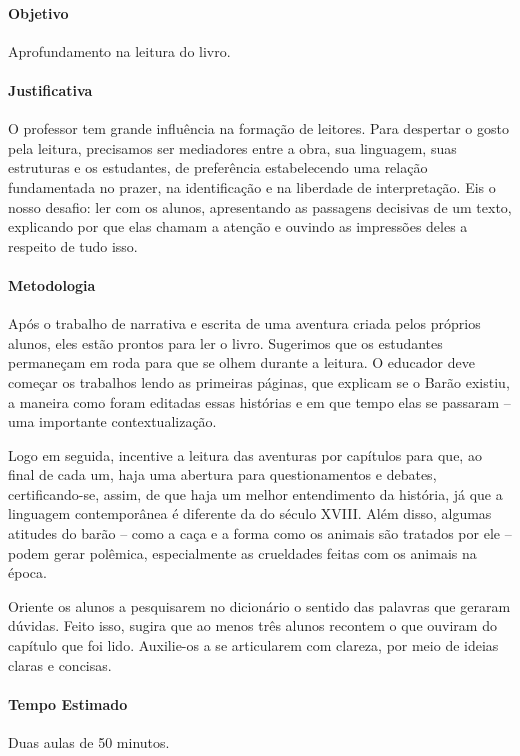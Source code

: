 \documentclass[11pt]{extarticle}
\begin{document}
\paragraph{Objetivo} Aprofundamento na leitura do livro.   

\paragraph{Justificativa} O professor tem grande influência na formação de leitores. Para despertar o gosto pela leitura, precisamos ser mediadores entre a obra, sua linguagem, suas estruturas e os estudantes, de preferência estabelecendo uma relação fundamentada no prazer, na identificação e na liberdade de interpretação. Eis o nosso desafio: ler com os alunos, apresentando as passagens decisivas de um texto, explicando por que elas chamam a atenção e  ouvindo as impressões deles a respeito de tudo isso. 

\paragraph{Metodologia} Após o trabalho de narrativa e escrita de uma aventura criada pelos próprios alunos, eles estão prontos para ler o livro. Sugerimos que os estudantes permaneçam em roda para que se olhem durante a leitura. O educador deve começar os trabalhos lendo as primeiras páginas, que explicam se o Barão existiu, a maneira como foram editadas essas histórias e em que tempo elas se passaram -- uma importante contextualização. 

Logo em seguida, incentive a leitura das aventuras por capítulos para que, ao final de cada um, haja uma abertura para questionamentos e debates, certificando-se, assim, de que haja um melhor entendimento da história, já que a linguagem contemporânea é diferente da do século XVIII. Além disso, algumas atitudes do barão -- como a caça e a forma como os animais são tratados por ele -- podem gerar polêmica, especialmente as crueldades feitas com os animais na época. 

Oriente os alunos a pesquisarem no dicionário o sentido das palavras que geraram dúvidas. Feito isso, sugira que ao menos três alunos recontem o que ouviram do capítulo que foi lido. Auxilie-os a se articularem com clareza, por meio de ideias claras e concisas.

\paragraph{Tempo Estimado} Duas aulas de 50 minutos.  
\end{document}

